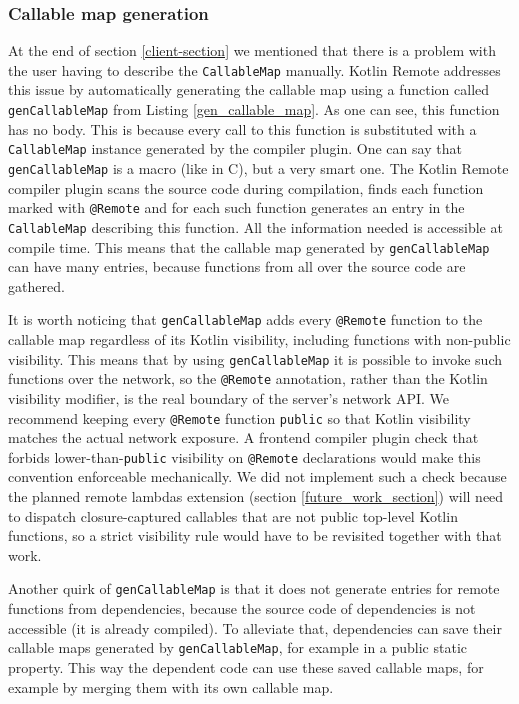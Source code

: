 \documentclass[a4paper,11pt,oneside]{article}
\newcommand{\kotlini}[1]{\texttt{#1}}
\newcommand{\ki}[1]{\kotlini{#1}}
\begin{document}
\subsubsection{Callable map generation} \label{callable_map_generation}

At the end of section \ref{client-section} we mentioned that there is a problem with the user
having to describe the \ki{CallableMap} manually. Kotlin Remote addresses this issue by automatically generating
the callable map using a function called \ki{genCallableMap} from Listing \ref{gen_callable_map}. As one
can see, this function has no body. This is because every call to this function is
substituted with a \ki{CallableMap} instance generated by the compiler plugin. One can say that
\ki{genCallableMap} is a macro (like in C), but a very smart one. The Kotlin Remote
compiler plugin scans the source code during compilation, finds each function marked with
\ki{@Remote} and for each such function generates an entry in the \ki{CallableMap} describing this
function. All the information needed is accessible at compile time. This means that the callable map
generated by \ki{genCallableMap} can have many entries, because functions from all over the
source code are gathered.

It is worth noticing that \ki{genCallableMap} adds every \ki{@Remote} function to the callable
map regardless of its Kotlin visibility, including functions with non-public visibility. This
means that by using \ki{genCallableMap} it is possible to invoke such functions over the
network, so the \ki{@Remote} annotation, rather than the Kotlin visibility modifier, is the
real boundary of the server's network API. We recommend keeping every \ki{@Remote} function
\kotlini{public} so that Kotlin visibility matches the actual network exposure. A frontend
compiler plugin check that forbids lower-than-\kotlini{public} visibility on \ki{@Remote}
declarations would make this convention enforceable mechanically. We did not implement such a
check because the planned remote lambdas extension (section \ref{future_work_section}) will
need to dispatch closure-captured callables that are not public top-level Kotlin functions, so
a strict visibility rule would have to be revisited together with that work.

Another quirk of \ki{genCallableMap} is that it does not generate entries for remote
functions from dependencies, because the source code of dependencies is not accessible (it is
already compiled). To alleviate that, dependencies can save their callable maps generated by
\ki{genCallableMap}, for example in a public static property. This way the dependent code can use
these saved callable maps, for example by merging them with its own callable map.
\end{document}
